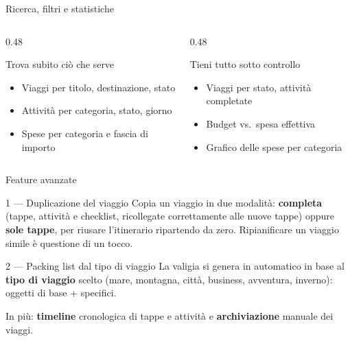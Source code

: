 \documentclass[aspectratio=169,11pt]{beamer}
\begin{document}
\begin{frame}{Ricerca, filtri e statistiche}
  \begin{columns}[T]
    \begin{column}{0.48\textwidth}
      \begin{block}{Trova subito ciò che serve}
        \begin{itemize}
          \item Viaggi per titolo, destinazione, stato
          \item Attività per categoria, stato, giorno
          \item Spese per categoria e fascia di importo
        \end{itemize}
      \end{block}
    \end{column}
    \begin{column}{0.48\textwidth}
      \begin{block}{Tieni tutto sotto controllo}
        \begin{itemize}
          \item Viaggi per stato, attività completate
          \item Budget vs.\ spesa effettiva
          \item Grafico delle spese per categoria
        \end{itemize}
      \end{block}
    \end{column}
  \end{columns}
\end{frame}

\begin{frame}{Feature avanzate}
  \begin{block}{1 --- Duplicazione del viaggio}
    Copia un viaggio in due modalità: \textbf{completa} (tappe, attività e checklist,
    ricollegate correttamente alle nuove tappe) oppure \textbf{sole tappe}, per riusare
    l'itinerario ripartendo da zero. Ripianificare un viaggio simile è questione di un tocco.
  \end{block}
  \begin{block}{2 --- Packing list dal tipo di viaggio}
    La valigia si genera in automatico in base al \textbf{tipo di viaggio} scelto
    (mare, montagna, città, business, avventura, inverno): oggetti di base + specifici.
  \end{block}
  \begin{center}\small\color{soft}
    In più: \textbf{timeline} cronologica di tappe e attività e \textbf{archiviazione}
    manuale dei viaggi.
  \end{center}
\end{frame}
\end{document}
